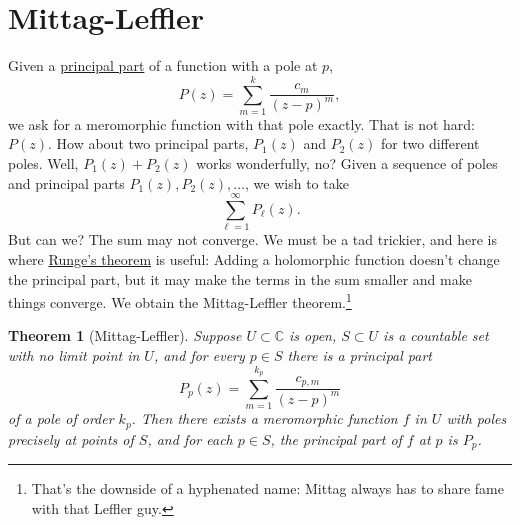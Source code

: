 \documentclass[12pt,openany]{book}
\newcommand{\C}{{\mathbb{C}}}
\theoremstyle{plain}
\newtheorem{thm}{Theorem}[section]
\theoremstyle{remark}
\theoremstyle{definition}
\theoremstyle{exercise}
\theoremstyle{example}
\begin{document}
\section{Mittag-Leffler}
\label{sec:mittaglefler}

Given a \hyperref[defn:principalpart]{principal part} of a function with a pole at $p$,
\begin{equation*}
P(z) = \sum_{m=1}^{k} \frac{c_m}{{(z-p)}^m} ,
\end{equation*}
we ask for a meromorphic function with that pole exactly.  That
is not hard: $P(z)$.  How about two principal parts, $P_1(z)$ and $P_2(z)$
for two different poles.  Well, $P_1(z)+P_2(z)$ works wonderfully, no?
Given a sequence of poles and principal parts
$P_1(z),P_2(z),\ldots$, we wish to take
\begin{equation*}
\sum_{\ell=1}^\infty P_\ell(z) .
\end{equation*}
But can we?  The sum may not converge.  We must be a tad
trickier, and here is where \hyperref[cor:rungeseq]{Runge's theorem} is useful:  Adding
a holomorphic function doesn't change the principal part, but it may make
the terms in the sum smaller and make things converge.
We obtain the
Mittag-Leffler theorem.\footnote{That's the downside of a hyphenated name:
Mittag always has to share fame with that Leffler guy.}

\begin{thm}[Mittag-Leffler]
Suppose $U \subset \C$ is open, $S \subset U$ is a countable set with no
limit point in $U$, and for every $p \in S$ there is a principal part
\begin{equation*}
P_p(z) = \sum_{m=1}^{k_p} \frac{c_{p,m}}{{(z-p)}^m}
\end{equation*}
of a pole of order $k_p$.  Then there exists a meromorphic function $f$ in $U$
with poles precisely at points of $S$, and for each $p \in S$,
the principal part of $f$ at $p$ is $P_p$.
\end{thm}
\end{document}
